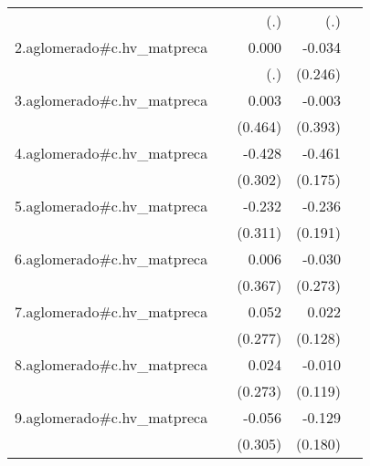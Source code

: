 {\begin{longtable}{l*{4}{D{.}{.}{-1}}}
            &                     &         (.)         &         (.)         &                     \\
\addlinespace
2.aglomerado#c.hv\_matpreca&                     &       0.000         &      -0.034         &                     \\
            &                     &         (.)         &     (0.246)         &                     \\
\addlinespace
3.aglomerado#c.hv\_matpreca&                     &       0.003         &      -0.003         &                     \\
            &                     &     (0.464)         &     (0.393)         &                     \\
\addlinespace
4.aglomerado#c.hv\_matpreca&                     &      -0.428         &      -0.461\sym{**} &                     \\
            &                     &     (0.302)         &     (0.175)         &                     \\
\addlinespace
5.aglomerado#c.hv\_matpreca&                     &      -0.232         &      -0.236         &                     \\
            &                     &     (0.311)         &     (0.191)         &                     \\
\addlinespace
6.aglomerado#c.hv\_matpreca&                     &       0.006         &      -0.030         &                     \\
            &                     &     (0.367)         &     (0.273)         &                     \\
\addlinespace
7.aglomerado#c.hv\_matpreca&                     &       0.052         &       0.022         &                     \\
            &                     &     (0.277)         &     (0.128)         &                     \\
\addlinespace
8.aglomerado#c.hv\_matpreca&                     &       0.024         &      -0.010         &                     \\
            &                     &     (0.273)         &     (0.119)         &                     \\
\addlinespace
9.aglomerado#c.hv\_matpreca&                     &      -0.056         &      -0.129         &                     \\
            &                     &     (0.305)         &     (0.180)         &                     \\

\end{longtable}}
